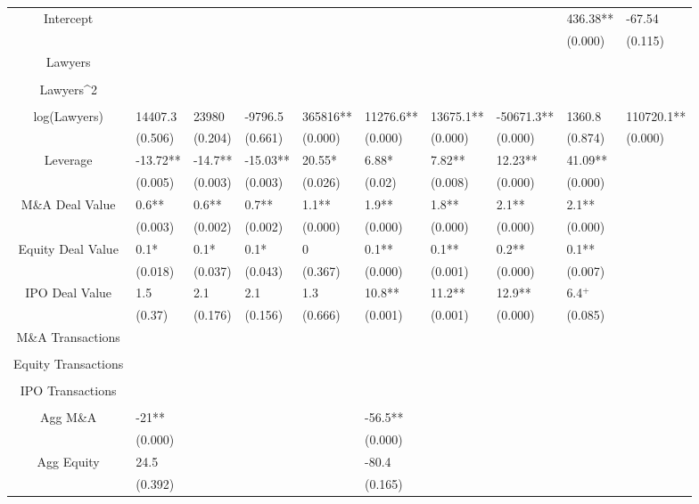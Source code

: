 \documentclass{article}
\begin{document}
\begin{table}[H]
\begin{tabular}{|clllllllll|}
Intercept &  &  &  &  &  &  &  & 436.38** & -67.54 \\ 
   &  &  &  &  &  &  &  & (0.000) & (0.115) \\ 
  Lawyers &  &  &  &  &  &  &  &  &  \\ 
   &  &  &  &  &  &  &  &  &  \\ 
  Lawyers^2 &  &  &  &  &  &  &  &  &  \\ 
   &  &  &  &  &  &  &  &  &  \\ 
  log(Lawyers) & 14407.3 & 23980 & -9796.5 & 365816** & 11276.6** & 13675.1** & -50671.3** & 1360.8 & 110720.1** \\ 
   & (0.506) & (0.204) & (0.661) & (0.000) & (0.000) & (0.000) & (0.000) & (0.874) & (0.000) \\ 
  Leverage & -13.72** & -14.7** & -15.03** & 20.55* & 6.88* & 7.82** & 12.23** & 41.09** &  \\ 
   & (0.005) & (0.003) & (0.003) & (0.026) & (0.02) & (0.008) & (0.000) & (0.000) &  \\ 
  M\&A Deal Value & 0.6** & 0.6** & 0.7** & 1.1** & 1.9** & 1.8** & 2.1** & 2.1** &  \\ 
   & (0.003) & (0.002) & (0.002) & (0.000) & (0.000) & (0.000) & (0.000) & (0.000) &  \\ 
  Equity Deal Value & 0.1* & 0.1* & 0.1* & 0 & 0.1** & 0.1** & 0.2** & 0.1** &  \\ 
   & (0.018) & (0.037) & (0.043) & (0.367) & (0.000) & (0.001) & (0.000) & (0.007) &  \\ 
  IPO Deal Value & 1.5 & 2.1 & 2.1 & 1.3 & 10.8** & 11.2** & 12.9** & 6.4$^{+}$ &  \\ 
   & (0.37) & (0.176) & (0.156) & (0.666) & (0.001) & (0.001) & (0.000) & (0.085) &  \\ 
  M\&A Transactions &  &  &  &  &  &  &  &  &  \\ 
   &  &  &  &  &  &  &  &  &  \\ 
  Equity Transactions &  &  &  &  &  &  &  &  &  \\ 
   &  &  &  &  &  &  &  &  &  \\ 
  IPO Transactions &  &  &  &  &  &  &  &  &  \\ 
   &  &  &  &  &  &  &  &  &  \\ 
  Agg M\&A & -21** &  &  &  & -56.5** &  &  &  &  \\ 
   & (0.000) &  &  &  & (0.000) &  &  &  &  \\ 
  Agg Equity & 24.5 &  &  &  & -80.4 &  &  &  &  \\ 
   & (0.392) &  &  &  & (0.165) &  &  &  &  \\ 

\end{tabular}
\end{table}
\end{document}
